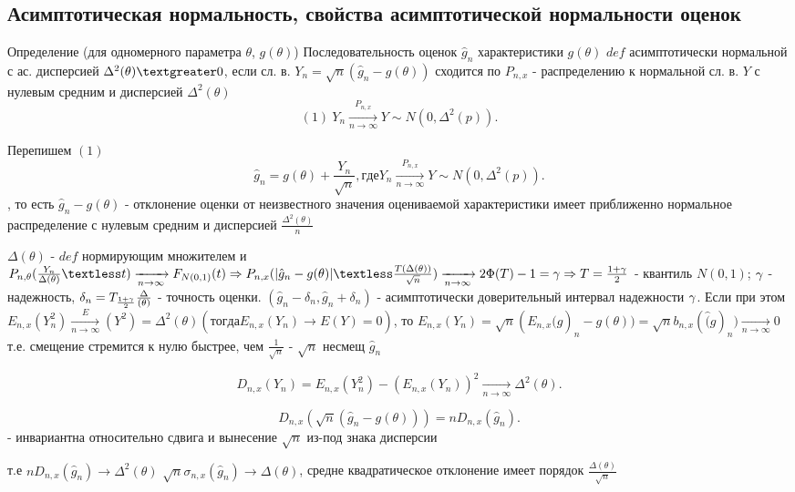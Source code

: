 \subsection{Асимптотическая нормальность, свойства асимптотической нормальности оценок}

Определение (для одномерного параметра $\theta$, $g(\theta)$)
Последовательность оценок $\hat{g}_n$ характеристики $g(\theta)$ $def$ асимптотически нормальной с ас. дисперсией $\Delta^2(\theta) \textgreater 0$, если сл. в. $Y_n = \sqrt{n}(\hat{g}_n - g(\theta))$ сходится по $P_{n, x}$ - распределению к нормальной сл. в. $Y$ с нулевым средним и дисперсией $\Delta^2(\theta)$
\[
  (1)~ Y_n \xrightarrow[n \to \infty]{P_{n, x}} Y \sim N(0, \Delta^2(p))
.\]

Перепишем $(1)$
\[
  \hat{g}_n = g(\theta) + \frac{Y_n}{\sqrt{n}}, где Y_n \xrightarrow[n \to \infty]{P_{n, x}} Y \sim N(0, \Delta^2(p))
.\], то есть
$\hat{g}_n - g(\theta)$ - отклонение оценки от неизвестного значения оцениваемой характеристики имеет приближенно нормальное распределение с нулевым средним и дисперсией $\frac{\Delta^2(\theta)}{n}$


$\Delta(\theta)$ - $def$ нормирующим множителем и $P_{n, \theta}(\frac{Y_n}{\Delta(\theta)} \textless t) \xrightarrow[n \to \infty]{} F_{N(0, 1)}(t) \Rightarrow{} P_{n, x}(|\hat{g}_n - g(\theta)| \textless \frac{T(\Delta(\theta))} {\sqrt{n}}) \xrightarrow[n \to \infty]{} 2\Phi(T) - 1 = \g \Rightarrow{} T = \frac{1 + \g}{2}$ - квантиль $N(0, 1)$;
$\gamma$ - надежность, $\delta_n = T_{\frac{1 + \gamma}{2}}\frac{\Delta}{(\theta)}$ - точность оценки.
$(\hat{g}_n - \delta_n, \hat{g}_n + \delta_n)$ - асимптотически доверительный интервал надежности $\gamma$.
Если при этом $E_{n, x}(Y_n^2) \xrightarrow[n \to \infty] E(Y^2) = \Delta^2(\theta) (тогда E_{n, x}(Y_n) \xrightarrow[]{} E(Y) = 0)$, то $E_{n, x}(Y_n) = \sqrt{n}(E_{n, x}\hat(g)_n - g(\theta))
 = \sqrt{n}b_{n, x}(\hat(g)_n) \xrightarrow[n \to \infty]{} 0$
 т.е. смещение стремится к нулю быстрее, чем $\frac{1}{\sqrt{n}}$
- $\sqrt{n}$ несмещ $\hat{g}_n$

\[
  D_{n, x}(Y_n) = E_{n, x}(Y_n^2) - (E_{n, x}(Y_n))^2 \xrightarrow[n \to \infty]{} \Delta^2(\theta)
.\]

\[
  D_{n, x}(\sqrt{n}(\hat{g}_n - g(\theta))) = nD_{n, x}(\hat{g}_n)
.\] - инвариантна относительно сдвига и вынесение $\sqrt{n}$ из-под знака дисперсии

т.е $nD_{n, x}(\hat{g}_n) \xrightarrow[]{} \Delta^2(\theta)$
$\sqrt{n}\sigma_{n, x}(\hat{g}_n) \xrightarrow[]{} \Delta(\theta)$, средне квадратическое отклонение имеет порядок $\frac{\Delta(\theta)}{\sqrt{n}}$

